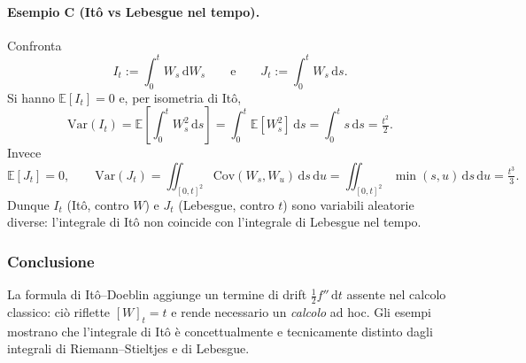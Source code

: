 \documentclass[12pt,a4paper]{book}
\theoremstyle{remark}
\newcommand{\EE}{\mathbb{E}}          %
\newcommand{\Var}{\mathrm{Var}}       %
\newcommand{\Cov}{\mathrm{Cov}}       %
\newcommand{\dd}{\mathrm{d}}
\begin{document}
\paragraph{Esempio C (It\^o vs Lebesgue nel tempo).}
Confronta
\[
I_t:=\int_0^t W_s\,\dd W_s
\qquad\text{e}\qquad
J_t:=\int_0^t W_s\,\dd s .
\]
Si hanno $\EE[I_t]=0$ e, per isometria di It\^o,
\[
\Var(I_t)= \EE\!\left[\int_0^t W_s^2\,\dd s\right]= \int_0^t \EE[W_s^2]\,\dd s = \int_0^t s\,\dd s = \tfrac{t^2}{2}.
\]
Invece
\[
\EE[J_t]=0,\qquad
\Var(J_t)= \iint_{[0,t]^2}\!\!\Cov(W_s,W_u)\,\dd s\,\dd u
= \iint_{[0,t]^2}\!\!\min(s,u)\,\dd s\,\dd u
= \tfrac{t^3}{3}.
\]
Dunque $I_t$ (It\^o, contro $W$) e $J_t$ (Lebesgue, contro $t$) sono variabili aleatorie diverse: l’integrale di It\^o non coincide con l’integrale di Lebesgue nel tempo.

\subsubsection*{Conclusione}
La formula di It\^o--Doeblin aggiunge un termine di drift $\tfrac12 f''\,\dd t$ assente nel calcolo classico: ciò riflette $[W]_t=t$ e rende necessario un \emph{calcolo} ad hoc. Gli esempi mostrano che l’integrale di It\^o è concettualmente e tecnicamente distinto dagli integrali di Riemann--Stieltjes e di Lebesgue.
\end{document}
